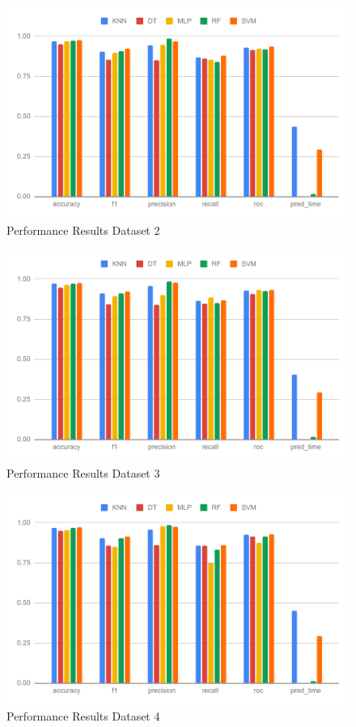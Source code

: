 \documentclass[a4paper,fleqn]{cas-dc}
\begin{document}
\begin{figure}[ht]
    \centering
    \includegraphics[width=1.9\columnwidth]{perf_ds_2.pdf}
    \caption{Performance Results Dataset 2} \label{fig:perfromance_results_dataset_2}
\end{figure}

\begin{figure}[ht]
    \centering
    \includegraphics[width=1.9\columnwidth]{perf_ds_3.pdf}
    \caption{Performance Results Dataset 3} \label{fig:perfromance_results_dataset_3}
\end{figure}

\begin{figure}[ht]
    \centering
    \includegraphics[width=1.9\columnwidth]{perf_ds_4.pdf}
    \caption{Performance Results Dataset 4} \label{fig:perfromance_results_dataset_4}
\end{figure}
\end{document}
